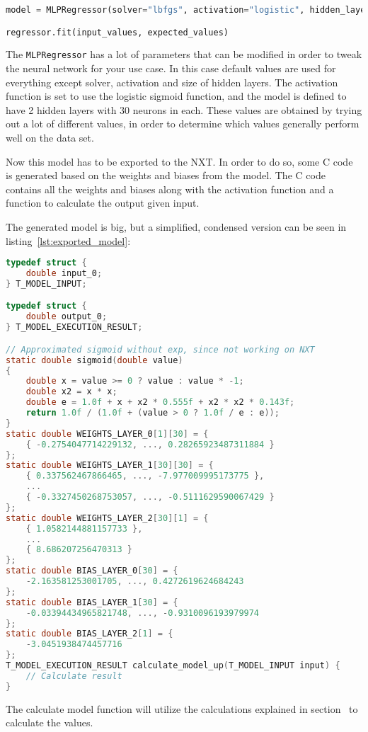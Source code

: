 \begin{lstlisting}[language=python,label={lst:mlpregressor},caption={Training a MLPRegressor with scikit}]
model = MLPRegressor(solver="lbfgs", activation="logistic", hidden_layer_sizes=(30, 30))

regressor.fit(input_values, expected_values)
\end{lstlisting}

The \texttt{MLPRegressor} has a lot of parameters that can be modified in order to tweak the neural network for your use case.
In this case default values are used for everything except solver, activation and size of hidden layers.
The activation function is set to use the logistic sigmoid function, and the model is defined to have 2 hidden layers with 30 neurons in each.
These values are obtained by trying out a lot of different values, in order to determine which values generally perform well on the data set.


Now this model has to be exported to the NXT. 
In order to do so, some C code is generated based on the weights and biases from the model.
The C code contains all the weights and biases along with the activation function and a function to calculate the output given input.

The generated model is big, but a simplified, condensed version can be seen in listing~\ref{lst:exported_model}:


\begin{lstlisting}[language=C,label={lst:exported_model},caption={Autogenerated model for getting power to move up}]
typedef struct {
	double input_0;
} T_MODEL_INPUT;

typedef struct {
	double output_0;
} T_MODEL_EXECUTION_RESULT;

// Approximated sigmoid without exp, since not working on NXT
static double sigmoid(double value)
{
	double x = value >= 0 ? value : value * -1;
	double x2 = x * x;
	double e = 1.0f + x + x2 * 0.555f + x2 * x2 * 0.143f;
	return 1.0f / (1.0f + (value > 0 ? 1.0f / e : e));
}
static double WEIGHTS_LAYER_0[1][30] = {
	{ -0.2754047714229132, ..., 0.28265923487311884 }
};
static double WEIGHTS_LAYER_1[30][30] = {
	{ 0.337562467866465, ..., -7.977009995173775 },
	...
	{ -0.3327450268753057, ..., -0.5111629590067429 }
};
static double WEIGHTS_LAYER_2[30][1] = {
	{ 1.0582144881157733 },
	...
	{ 8.686207256470313 }
};
static double BIAS_LAYER_0[30] = {
	-2.163581253001705, ..., 0.4272619624684243
};
static double BIAS_LAYER_1[30] = {
	-0.03394434965821748, ..., -0.9310096193979974
};
static double BIAS_LAYER_2[1] = {
	-3.0451938474457716
};
T_MODEL_EXECUTION_RESULT calculate_model_up(T_MODEL_INPUT input) {
	// Calculate result
}

\end{lstlisting}

The calculate model function will utilize the calculations explained in section~ to calculate the values.


